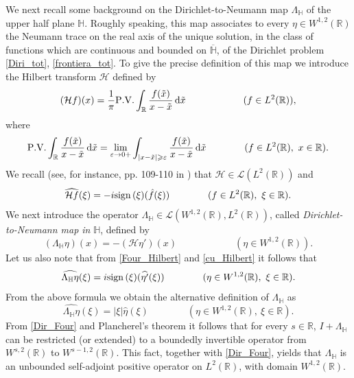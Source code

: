 \documentclass{amsart} %
\numberwithin{equation}{section}
\theoremstyle{definition}
\begin{document}
We next recall  some background on the Dirichlet-to-Neumann map $\Lambda_\mathbb{H}$ of the upper half plane $\mathbb{H}$. Roughly speaking, this map associates to every $\eta\in W^{1,2}(\mathbb{R})$ the Neumann trace on the real axis of 
the unique  solution, in the class of functions which are continuous and bounded on $\overline{\mathbb{H}}$, of
the Dirichlet problem \eqref{Diri_tot}, \eqref{frontiera_tot}. To give the precise definition of this map
we introduce the Hilbert transform $\mathcal{H}$ defined by
\begin{equation}\label{prima_parte_finita}
(\mathcal{H} f)(x)=\frac1\pi  {\rm P.V.} \int_\mathbb{R} \frac{f(\tilde x)}{x- \tilde x}\, {\rm d}\tilde x
\qquad\qquad\qquad(f\in L^2(\mathbb{R})),
\end{equation}
where
$$
{\rm P.V.} \int_\mathbb{R} \frac{f(\tilde x)}{x- \tilde x}\, {\rm d}\tilde x =\lim_{\varepsilon\to 0+}
\int_{|x-\tilde x|\geqslant\varepsilon} \frac{f(\tilde x)}{x- \tilde x}\, {\rm d}\tilde x
\qquad\qquad(f\in L^2(\mathbb{R}),\ x\in \mathbb{R}).
$$
We recall (see, for instance, pp. 109-110 in \cite{grafakos2024fundamentals}) that $\mathcal{H}\in \mathcal{L}(L^2(\mathbb{R}))$ and
\begin{equation}\label{Four_Hilbert}
\widehat{\mathcal{H}f}(\xi)=-i{\rm sign}\, (\xi) (\hat{f}(\xi))\qquad\qquad(f\in L^2(\mathbb{R}),\ \xi\in \mathbb{R}).
\end{equation}
We next introduce the operator 
$\Lambda_\mathbb{H}\in \mathcal{L}(W^{1,2}(\mathbb{R}),L^2(\mathbb{R}))$, called {\em Dirichlet-to-Neumann map in} $\mathbb{H}$,
defined by
\begin{equation}\label{cu_Hilbert}
(\Lambda_\mathbb{H}\eta)(x)=-(\mathcal{H}\eta')(x) \qquad\qquad\qquad(\eta\in W^{1,2}(\mathbb{R})).
\end{equation}
Let us also note that from \eqref{Four_Hilbert} and \eqref{cu_Hilbert} it follows that
\begin{equation*}
\widehat{\Lambda_\mathbb{H} \eta}(\xi)=
i{\rm sign}\, (\xi) (\widehat{\eta'}(\xi))\qquad\qquad(\eta\in W^{1,2}(\mathbb{R}),\ \xi\in \mathbb{R}).
\end{equation*}
From the above formula we obtain the alternative definition of $\Lambda_\mathbb{H}$ as
\begin{equation}\label{Dir_Four}
\widehat{\Lambda_\mathbb{H} \eta}(\xi)=|\xi| \hat \eta(\xi) \qquad\qquad(\eta\in W^{1,2}(\mathbb{R}),\ \xi\in \mathbb{R}).
\end{equation}
From \eqref{Dir_Four} and Plancherel's theorem it follows that for every $s\in \mathbb{R}$, $I+\Lambda_\mathbb{H}$ can be restricted (or extended) to a boundedly invertible operator from $W^{s,2}(\mathbb{R})$ to $W^{s-1,2}(\mathbb{R})$. This fact, together with \eqref{Dir_Four}, yields that
$\Lambda_\mathbb{H}$ is an unbounded self-adjoint positive operator on $L^2(\mathbb{R})$, with domain $W^{1,2}(\mathbb{R})$.
\end{document}
